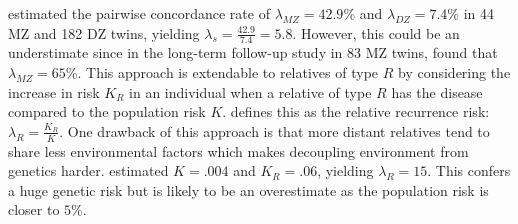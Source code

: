 
\citet{Hyttinen:2003kn} estimated the pairwise concordance rate of $\lambda_{MZ}=42.9\%$ and $\lambda_{DZ}=7.4\%$ in 44 MZ and 182 DZ twins,
yielding $\lambda_s = \frac{42.9}{7.4} = 5.8$.
However, this could be an understimate since in the long-term follow-up study in 83 MZ twins, \citet{Redondo:2008} found that $\lambda_{MZ}=65\%$.
This approach is extendable to relatives of type $R$ by considering the increase in risk $K_R$ in an individual when a relative of type $R$ has the disease compared to the population risk $K$.
\citet{Risch:1987wm} defines this as the relative recurrence risk: $\lambda_R = \frac{K_R}{K}$.
One drawback of this approach is that more distant relatives tend to share less environmental factors which makes decoupling environment from genetics harder.
\cite{Risch:1987wm} estimated $K=.004$ and $K_R=.06$, yielding $\lambda_R=15$.
This confers a huge genetic risk but is likely to be an overestimate as the population risk is closer to $5\%$.









